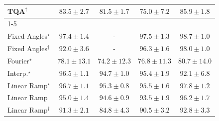 \begin{tabular}{l|cccc|}
TQA$^\dagger$ & {\cellcolor[HTML]{8BCE81}} \color[HTML]{000000} $83.5\pm 2.7$ & {\cellcolor[HTML]{A9DB8C}} \color[HTML]{000000} $81.5\pm 1.7$ & {\cellcolor[HTML]{F1FAB5}} \color[HTML]{000000} $75.0\pm 7.2$ & {\cellcolor[HTML]{66BD70}} \color[HTML]{F1F1F1} $85.9\pm 1.8$ \\
\cline{1-5}
\multicolumn{5}{c}{\rule{0pt}{8pt}SV} \\
\midrule
Fixed Angles$^\star$ & {\cellcolor[HTML]{03446A}} \color[HTML]{F1F1F1} $97.4\pm 1.4$ & {\cellcolor[HTML]{000000}} \color[HTML]{F1F1F1} {\cellcolor{white}} \color{black} - & {\cellcolor[HTML]{03446A}} \color[HTML]{F1F1F1} $97.5\pm 1.3$ & {\cellcolor[HTML]{023858}} \color[HTML]{F1F1F1} $98.7\pm 1.0$ \\
Fixed Angles$^\dagger$ & {\cellcolor[HTML]{056EAD}} \color[HTML]{F1F1F1} $92.0\pm 3.6$ & {\cellcolor[HTML]{000000}} \color[HTML]{F1F1F1} {\cellcolor{white}} \color{black} - & {\cellcolor[HTML]{034F7D}} \color[HTML]{F1F1F1} $96.3\pm 1.6$ & {\cellcolor[HTML]{023E62}} \color[HTML]{F1F1F1} $98.0\pm 1.0$ \\
Fourier$^\star$ & {\cellcolor[HTML]{CDD0E5}} \color[HTML]{000000} $78.1\pm 13.1$ & {\cellcolor[HTML]{EDE7F2}} \color[HTML]{000000} $74.2\pm 12.3$ & {\cellcolor[HTML]{D8D7E9}} \color[HTML]{000000} $76.8\pm 11.3$ & {\cellcolor[HTML]{ADC1DD}} \color[HTML]{000000} $80.7\pm 14.0$ \\
Interp.$^\star$ & {\cellcolor[HTML]{034D79}} \color[HTML]{F1F1F1} $96.5\pm 1.1$ & {\cellcolor[HTML]{045D92}} \color[HTML]{F1F1F1} $94.7\pm 1.0$ & {\cellcolor[HTML]{04588A}} \color[HTML]{F1F1F1} $95.4\pm 1.9$ & {\cellcolor[HTML]{056DAC}} \color[HTML]{F1F1F1} $92.1\pm 6.8$ \\
Linear Ramp$^\star$ & {\cellcolor[HTML]{034B76}} \color[HTML]{F1F1F1} $96.7\pm 1.1$ & {\cellcolor[HTML]{04598C}} \color[HTML]{F1F1F1} $95.3\pm 0.8$ & {\cellcolor[HTML]{045788}} \color[HTML]{F1F1F1} $95.5\pm 1.6$ & {\cellcolor[HTML]{034165}} \color[HTML]{F1F1F1} $97.8\pm 1.2$ \\
Linear Ramp & {\cellcolor[HTML]{045B8E}} \color[HTML]{F1F1F1} $95.0\pm 1.4$ & {\cellcolor[HTML]{045E93}} \color[HTML]{F1F1F1} $94.6\pm 0.9$ & {\cellcolor[HTML]{04649E}} \color[HTML]{F1F1F1} $93.5\pm 1.9$ & {\cellcolor[HTML]{034F7D}} \color[HTML]{F1F1F1} $96.2\pm 1.7$ \\
Linear Ramp$^\dagger$ & {\cellcolor[HTML]{0A73B2}} \color[HTML]{F1F1F1} $91.3\pm 2.1$ & {\cellcolor[HTML]{73A9CF}} \color[HTML]{F1F1F1} $84.8\pm 4.3$ & {\cellcolor[HTML]{167BB6}} \color[HTML]{F1F1F1} $90.5\pm 3.2$ & {\cellcolor[HTML]{0569A5}} \color[HTML]{F1F1F1} $92.8\pm 3.3$ \\

\end{tabular}
